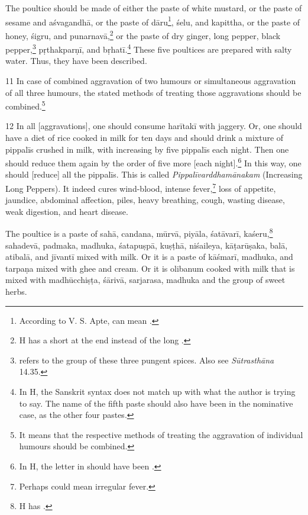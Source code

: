 \begin{translation}
     The poultice should be made of either the paste of white mustard, or the paste of sesame and \gls{aśvagandhā}, or the paste of \gls{dāru}\footnote{According to V. S. Apte,  can mean .}, \gls{śelu}, and \gls{kapittha}, or the paste of honey, \gls{śigru}, and \gls{punarnavā},\footnote{H has a short  at the end instead of the long .} or the paste of dry ginger, long pepper, black pepper,\footnote{ refers to the group of these three pungent spices. Also see \textit{Sūtrasthāna} 14.35.} \gls{pṛthakparṇī}, and \gls{bṛhatī}.\footnote{In H, the Sanskrit syntax does not match up with what the author is trying to say. The name of the fifth paste should also have been in the nominative case, as the other four pastes.} These five poultices are prepared with salty water. Thus, they have been described.

     \item[11] 
     In case of combined aggravation of two humours or simultaneous aggravation of all three humours, the stated methods of treating those aggravations should be combined.\footnote{It means that the respective methods of treating the aggravation of individual humours should be combined.}  

     \item[12] 
    In all [aggravations], one should consume \gls{harītakī} with jaggery. Or, one should have a diet of rice cooked in milk for ten days and should drink a mixture of \gls{pippalī}s crushed in milk, with increasing by five \gls{pippalī}s each night. Then one should reduce them again by the order of five more [each night].\footnote{In H, the letter  in  should have been .} In this way, one should [reduce] all the \gls{pippalī}s. This is called \textit{Pippalīvarddhamānakam} (Increasing Long Peppers). It indeed cures wind-blood, intense fever,\footnote{Perhaps  could mean irregular fever.} loss of appetite, jaundice, abdominal affection, piles, heavy breathing, cough, wasting disease, weak digestion, and heart disease. 

    The poultice is a paste of \gls{sahā}, \gls{candana}, \gls{mūrvā}, \gls{piyāla}, \gls{śatāvarī}, \gls{kaśeru},\footnote{H has .} \gls{sahadevā}, \gls{padmaka}, \gls{madhuka}, \gls{śatapuṣpā}, \gls{kuṣṭhā}, \gls{niśaileya}, \gls{kāṭarūṣaka}, \gls{balā}, \gls{atibalā}, and \gls{jīvantī} mixed with milk. Or it is a paste of \gls{kāśmarī}, \gls{madhuka}, and \gls{tarpaṇa} mixed with ghee and cream. Or it is olibanum cooked with milk that is mixed with \gls{madhūcchiṣṭa}, \gls{śārivā}, \gls{sarjarasa}, \gls{madhuka} and the group of sweet herbs. 


\end{translation}
